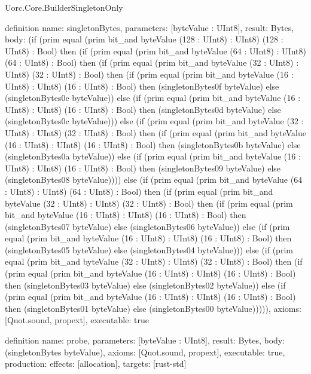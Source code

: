 \begin{lexlean}{Uorc.Core.BuilderSingletonOnly}
\begin{semanticmodule}
definition{
  name: singletonBytes,
  parameters: [byteValue : UInt8],
  result: Bytes,
  body: (if (prim equal (prim bit_and byteValue (128 : UInt8) : UInt8) (128 : UInt8) : Bool) then (if (prim equal (prim bit_and byteValue (64 : UInt8) : UInt8) (64 : UInt8) : Bool) then (if (prim equal (prim bit_and byteValue (32 : UInt8) : UInt8) (32 : UInt8) : Bool) then (if (prim equal (prim bit_and byteValue (16 : UInt8) : UInt8) (16 : UInt8) : Bool) then (singletonBytes0f byteValue) else (singletonBytes0e byteValue)) else (if (prim equal (prim bit_and byteValue (16 : UInt8) : UInt8) (16 : UInt8) : Bool) then (singletonBytes0d byteValue) else (singletonBytes0c byteValue))) else (if (prim equal (prim bit_and byteValue (32 : UInt8) : UInt8) (32 : UInt8) : Bool) then (if (prim equal (prim bit_and byteValue (16 : UInt8) : UInt8) (16 : UInt8) : Bool) then (singletonBytes0b byteValue) else (singletonBytes0a byteValue)) else (if (prim equal (prim bit_and byteValue (16 : UInt8) : UInt8) (16 : UInt8) : Bool) then (singletonBytes09 byteValue) else (singletonBytes08 byteValue)))) else (if (prim equal (prim bit_and byteValue (64 : UInt8) : UInt8) (64 : UInt8) : Bool) then (if (prim equal (prim bit_and byteValue (32 : UInt8) : UInt8) (32 : UInt8) : Bool) then (if (prim equal (prim bit_and byteValue (16 : UInt8) : UInt8) (16 : UInt8) : Bool) then (singletonBytes07 byteValue) else (singletonBytes06 byteValue)) else (if (prim equal (prim bit_and byteValue (16 : UInt8) : UInt8) (16 : UInt8) : Bool) then (singletonBytes05 byteValue) else (singletonBytes04 byteValue))) else (if (prim equal (prim bit_and byteValue (32 : UInt8) : UInt8) (32 : UInt8) : Bool) then (if (prim equal (prim bit_and byteValue (16 : UInt8) : UInt8) (16 : UInt8) : Bool) then (singletonBytes03 byteValue) else (singletonBytes02 byteValue)) else (if (prim equal (prim bit_and byteValue (16 : UInt8) : UInt8) (16 : UInt8) : Bool) then (singletonBytes01 byteValue) else (singletonBytes00 byteValue))))),
  axioms: [Quot.sound, propext],
  executable: true
}

definition{
  name: probe,
  parameters: [byteValue : UInt8],
  result: Bytes,
  body: (singletonBytes byteValue),
  axioms: [Quot.sound, propext],
  executable: true,
  production: {effects: [allocation], targets: [rust-std]}
}
\end{semanticmodule}
\end{lexlean}

